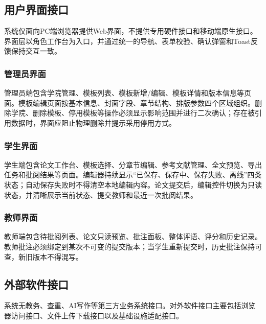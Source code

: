 \documentclass{../template/softeng}
\begin{document}
	\subsection{用户界面接口}
	系统仅面向PC端浏览器提供Web界面，不提供专用硬件接口和移动端原生接口。界面层以角色工作台为入口，并通过统一的导航、表单校验、确认弹窗和Toast反馈保持交互一致。
	
	\subsubsection{管理员界面}
	管理员端包含学院管理、模板列表、模板新增/编辑、模板详情和版本信息等页面。模板编辑页面按基本信息、封面字段、章节结构、排版参数四个区域组织。删除学院、删除模板、停用模板等操作必须显示影响范围并进行二次确认；存在被引用数据时，界面应阻止物理删除并提示采用停用方式。
	
	\subsubsection{学生界面}
	学生端包含论文工作台、模板选择、分章节编辑、参考文献管理、全文预览、导出任务和批阅结果等页面。编辑器持续显示“已保存、保存中、保存失败、离线”四类状态；自动保存失败时不得清空本地编辑内容。论文提交后，编辑控件切换为只读状态，并清晰展示当前状态、提交教师和最近一次批阅结果。
	
	\subsubsection{教师界面}
	教师端包含待批阅列表、论文只读预览、批注面板、整体评语、评分和历史记录。教师批注必须绑定到某次不可变的提交版本；当学生重新提交时，历史批注保持可查，新旧版本不得混写。
	
	\subsection{外部软件接口}
	系统无教务、查重、AI写作等第三方业务系统接口。对外软件接口主要包括浏览器访问接口、文件上传下载接口以及基础设施适配接口。
	
\end{document}
